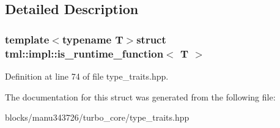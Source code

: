 \subsection{Detailed Description}
\subsubsection*{template$<$typename T$>$struct tml\+::impl\+::is\+\_\+runtime\+\_\+function$<$ T $>$}



Definition at line 74 of file type\+\_\+traits.\+hpp.



The documentation for this struct was generated from the following file\+:\begin{DoxyCompactItemize}
\item 
blocks/manu343726/turbo\+\_\+core/type\+\_\+traits.\+hpp\end{DoxyCompactItemize}

